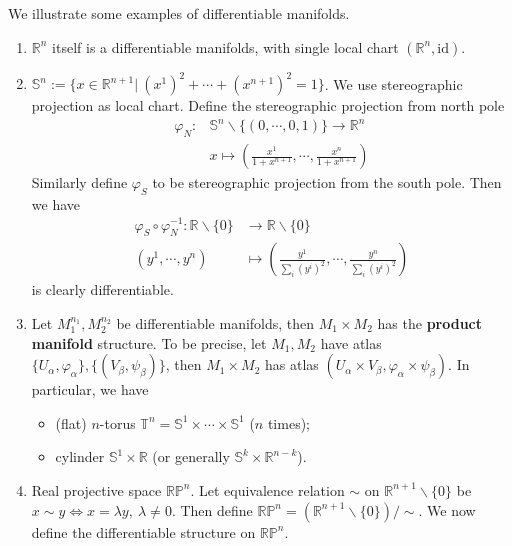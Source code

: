 \begin{eg}We illustrate some examples of differentiable manifolds.
    \begin{enumerate}[(1)]
        \item $\mathbb{R}^n$ itself is a differentiable manifolds, with single local chart $(\mathbb{R}^n,\mathrm{id})$.
        \item $\mathbb{S}^n:=\{x\in\mathbb{R}^{n+1}|\ (x^1)^2+\cdots+(x^{n+1})^2=1\}$.
        We use stereographic projection as local chart. Define the stereographic projection from north pole
        \begin{align*}
            \varphi_N:&\mathbb{S}^n\backslash\{(0,\cdots,0,1)\}\to\mathbb{R}^n\\
            &x\mapsto\left(\frac{x^1}{1+x^{n+1}},\cdots,\frac{x^n}{1+x^{n+1}}\right)
        \end{align*}
        Similarly define $\varphi_S$ to be stereographic projection from the south pole.
        Then we have
        \begin{align*}
            \varphi_S\circ\varphi_N^{-1}:\mathbb{R}\backslash\{0\}&\to\mathbb{R}\backslash\{0\}\\
            (y^1,\cdots,y^n)&\mapsto\left(\frac{y^1}{\sum_i(y^i)^2},\cdots,\frac{y^n}{\sum_i(y^i)^2}\right)
        \end{align*}
        is clearly differentiable.
        \item Let $M_1^{n_1},M_2^{n_2}$ be differentiable manifolds, then $M_1\times M_2$ has the \textbf{product manifold} structure.
        To be precise, let $M_1,M_2$ have atlas $\{U_\alpha,\varphi_\alpha\},\{(V_\beta,\psi_\beta)\}$, then $M_1\times M_2$ has atlas $(U_\alpha\times V_\beta,\varphi_\alpha\times\psi_\beta)$.
        In particular, we have
        \begin{itemize}
            \item (flat) $n$-torus $\mathbb{T}^n=\mathbb{S}^1\times\cdots\times\mathbb{S}^1$ ($n$ times);
            \item cylinder $\mathbb{S}^1\times\mathbb{R}$ (or generally $\mathbb{S}^k\times\mathbb{R}^{n-k}$).
        \end{itemize}
        \item Real projective space $\mathbb{RP}^n$.
        Let equivalence relation $\sim$ on $\mathbb{R}^{n+1}\backslash\{0\}$ be $x\sim y\iff x=\lambda y,\ \lambda\neq 0$.
        Then define $\mathbb{RP}^n=(\mathbb{R}^{n+1}\backslash\{0\})/\sim$.
        We now define the differentiable structure on $\mathbb{RP}^n$.

\end{enumerate}
\end{eg}
